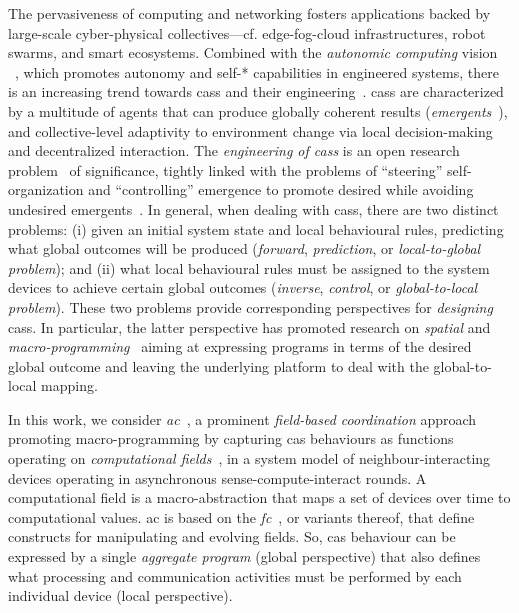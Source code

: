 The pervasiveness of computing and networking
 fosters applications 
 backed by large-scale cyber-physical collectives---cf. edge-fog-cloud infrastructures, robot swarms, %
 and smart ecosystems.
%
Combined with the \emph{autonomic computing} vision ~\cite{DBLP:journals/computer/KephartC03}, which promotes autonomy and self-* capabilities in engineered systems,
 there is an increasing trend towards \acp{cas} and their engineering~\cite{DBLP:journals/sttt/NicolaJW20,DBLP:journals/tasm/BucchiaroneDPCS20}.
%
\acp{cas} are characterized 
 by a multitude of agents  
 that can produce globally coherent results (\emph{emergents}~\cite{DBLP:conf/atal/WolfH04}),
 and collective-level adaptivity to environment change
 via local decision-making and decentralized interaction.
%
The \emph{engineering of \acp{cas}} is an open research problem~\cite{DBLP:journals/sttt/NicolaJW20,DBLP:journals/corr/abs-1108-5643} of significance, tightly linked with the problems of ``steering'' self-organization and ``controlling'' emergence to promote desired while avoiding undesired emergents~\cite{DBLP:books/sp/08/Muller-SchloerS08}.
%
In general, when dealing with \acp{cas},
 there are two distinct problems:
 (i) given an initial system state and local behavioural rules, predicting what global outcomes will be produced (\emph{forward}, \emph{prediction}, or \emph{local-to-global problem});
 and
 (ii) what local behavioural rules must be assigned to the system devices to achieve certain global outcomes (\emph{inverse}, \emph{control}, or \emph{global-to-local problem}).
%
These two problems provide corresponding perspectives
 for \emph{designing} \acp{cas}.
% 
In particular, the latter perspective has promoted research on \emph{spatial} and \emph{macro-programming}~\cite{beal2013organizing-aggregate,DBLP:journals/corr/abs-2201-03473}
 aiming at expressing programs in terms of the desired global outcome
 and leaving the underlying platform to deal with the global-to-local mapping.

In this work,
 we consider \emph{\ac{ac}}~\cite{DBLP:journals/computer/BealPV15}, a prominent \emph{field-based coordination} approach~\cite{DBLP:journals/jlap/ViroliBDACP19} 
promoting macro-programming 
 by capturing \ac{cas} behaviours 
 as functions operating on \emph{computational fields}~\cite{DBLP:journals/jlap/ViroliBDACP19},
 in a system model of neighbour-interacting devices
 operating in asynchronous sense-compute-interact rounds.
%
A computational field is a macro-abstraction
 that maps a set of devices over time to computational values.
%
\ac{ac} is based on the \emph{\ac{fc}}~\cite{DBLP:journals/jlap/ViroliBDACP19}, or variants thereof,
 that define constructs for manipulating and evolving fields.
%
So, \ac{cas} behaviour
 can be expressed by a single \emph{aggregate program} (global perspective)
 that also defines 
 what processing and communication activities
 must be performed by each individual device (local perspective).

